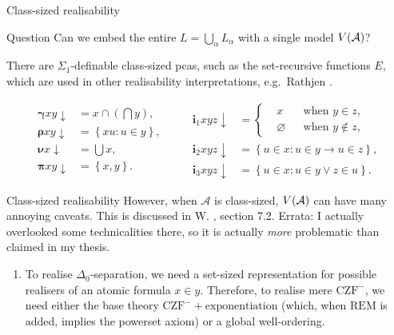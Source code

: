 \documentclass{beamer}
\begin{document}
\begin{frame}{Class-sized realisability}
  \begin{block}{Question}
    Can we embed the entire $L = \bigcup_\alpha L_\alpha$ with a single model $V\mleft(\mathcal{A}\mright)$?
  \end{block}

  \vspace{1em}

  There are $\Sigma_1$-definable class-sized pcas, such as the set-recursive functions $E$, which are used in other realisability interpretations, e.g.\ Rathjen .

  \[\begin{aligned}
      \bm{\gamma} xy {\downarrow} & = x \cap \left(\bigcap y\right), \\
      \bm{\rho} xy {\downarrow}   & = \left\{xu : u \in y\right\},   \\
      \bm{\nu} x {\downarrow}     & = \bigcup x,                     \\
      \bm{\pi} xy {\downarrow}    & = \left\{x, y\right\}.
    \end{aligned} \qquad \begin{aligned}
      \mathbf{i}_1 xyz {\downarrow} & = \left\{\begin{aligned}
                                                  & x           &  & \text{when $y \in z$},     \\
                                                  & \varnothing &  & \text{when $y \not\in z$},
                                               \end{aligned}\right. \\
      \mathbf{i}_2 xyz {\downarrow} & = \left\{u \in x : u \in y \rightarrow u \in z\right\}, \\
      \mathbf{i}_3 xyz {\downarrow} & = \left\{u \in x : u \in y \lor z \in u\right\}.
    \end{aligned}\]
\end{frame}

\begin{frame}{Class-sized realisability}
  However, when $\mathcal{A}$ is class-sized, $V\mleft(\mathcal{A}\mright)$ can have many annoying caveats. This is discussed in W. , section 7.2. \alert{Errata:} I actually overlooked some technicalities there, so it is actually \emph{more} problematic than claimed in my thesis.

  \vspace{1em}

  \begin{enumerate}
    \item To realise $\Delta_0$-separation, we need a set-sized representation for possible realisers of an atomic formula $x \in y$. Therefore, to realise mere $\mathrm{CZF}^-$, we need either the base theory $\mathrm{CZF}^- + \text{exponentiation}$ (which, when $\mathrm{REM}$ is added, implies the powerset axiom) or a global well-ordering.
  \end{enumerate}
\end{frame}
\end{document}
